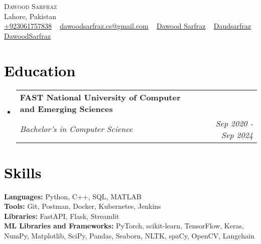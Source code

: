 \documentclass[letterpaper,11pt]{article}
\makeatletter
\newcommand{\resumeSubheading}[4]{
	\vspace{-2pt}\item
	\begin{tabular*}{1.0\textwidth}[t]{l@{\extracolsep{\fill}}r}
		\textbf{\large#1} & \textbf{\small #2} \\
		\textit{\large#3} & \textit{\small #4} \\
		
	\end{tabular*}\vspace{-7pt}
}
\newcommand{\resumeSubHeadingListStart}{\begin{itemize}[leftmargin=0.0in, label={}]}
\newcommand{\resumeSubHeadingListEnd}{\end{itemize}}
\makeatother
\begin{document}
	
	
	
	\begin{center}
		{\Huge \scshape Dawood Sarfraz} \\ \vspace{1pt}
		Lahore, Pakistan \\ \vspace{1pt}
		\small 
		\href{tel:+9203061757838}{\raisebox{-0.1\height}{\faPhone} \underline{{+923061757838}}} ~ 
		\href{mailto:dawoodsarfraz.cs@gmail.com}{\raisebox{-0.2\height}{\faEnvelope} \underline{{dawoodsarfraz.cs@gmail.com}}} ~ 
		\href{https://linkedin.com/in/dawood-sarfraz-0466541b6}{\raisebox{-0.2\height}{\faLinkedin}  \underline{{Dawood Sarfraz}}} ~
		\href{https://github.com/Daudsarfraz}{\raisebox{-0.2\height}{\faGithub} \underline{{Daudsarfraz}}} ~
		\href{https://daudsarfraz.github.io/DawoodSarfraz/}{\raisebox{-0.2\height}{\faGlobe} \underline{{DawoodSarfraz}}}
		\vspace{-5pt}
	\end{center}
	
	
	\section{\textcolor{black}{Education}}
	\resumeSubHeadingListStart
	\resumeSubheading
	{FAST National University of Computer and Emerging Sciences}{}
	{Bachelor's in Computer Science }{Sep 2020 - Sep 2024}
	\resumeSubHeadingListEnd
	\vspace{-12pt}

	\section{\textcolor{black}{Skills}}
	\begin{itemize}[leftmargin=0.01in, label={}]
		{\item{
				\textbf{\normalsize{Languages:}}{ \normalsize{Python, C++, SQL, MATLAB}} \\
				\textbf{\normalsize{Tools:}}{ \normalsize{Git, Postman, Docker, Kubernetes, Jenkins}} \\	
				\textbf{\normalsize{Libraries:}}{ \normalsize{FastAPI, Flask, Streamlit}}\\	
				\textbf{\normalsize{ML Libraries and Frameworks:}}{ \normalsize{PyTorch, scikit-learn, TensorFlow, Keras, NumPy, Matplotlib, SciPy, Pandas, Seaborn, NLTK, spaCy, OpenCV, Langchain}} \\
		}}
	\end{itemize}
	\vspace{-18pt}
	
\end{document}
